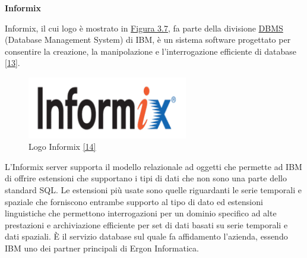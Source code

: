 \textbf{Informix}

Informix, il cui logo è mostrato in \hyperref[ibm]{Figura 3.7}, fa parte della divisione \hyperref[DBMS]{DBMS\glo} (Database Management System) di IBM, è un sistema software progettato per consentire la creazione,
la manipolazione e l'interrogazione efficiente di database \hyperref[informix]{[13]}.

\begin{figure}[H]
	\includegraphics[width=7cm]{immagini/Informix.png}
	\centering
	\caption{Logo Informix \hyperref[ilogo]{[14]}}
	\label{ibm}
\end{figure}


L'Informix server supporta il modello relazionale ad oggetti che permette ad IBM di offrire estensioni che supportano i tipi di dati che non sono una parte dello standard SQL.
Le estensioni più usate sono quelle riguardanti le serie temporali e spaziale che forniscono entrambe supporto al tipo di dato ed estensioni linguistiche che permettono 
interrogazioni per un dominio specifico ad alte prestazioni e archiviazione efficiente per set di dati basati su serie temporali e dati spaziali.
È il servizio database sul quale fa affidamento l'azienda, essendo IBM uno dei partner principali di Ergon Informatica.